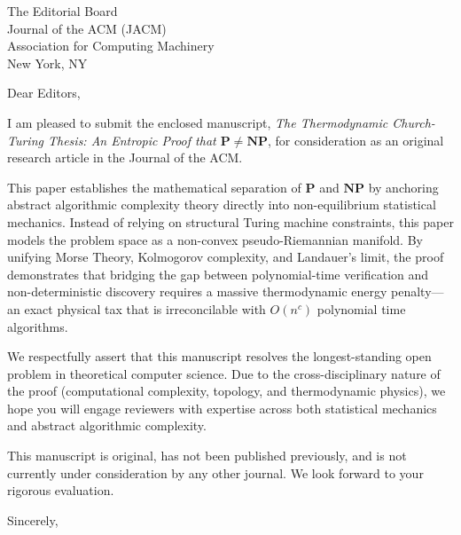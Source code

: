 \documentclass[11pt, a4paper]{letter}
\begin{document}
\begin{letter}{
The Editorial Board \\
Journal of the ACM (JACM) \\
Association for Computing Machinery \\
New York, NY
}

\date{\today}
\opening{Dear Editors,}

I am pleased to submit the enclosed manuscript, \textit{The Thermodynamic Church-Turing Thesis: An Entropic Proof that $\mathbf{P} \neq \mathbf{NP}$}, for consideration as an original research article in the Journal of the ACM.

This paper establishes the mathematical separation of $\mathbf{P}$ and $\mathbf{NP}$ by anchoring abstract algorithmic complexity theory directly into non-equilibrium statistical mechanics. Instead of relying on structural Turing machine constraints, this paper models the problem space as a non-convex pseudo-Riemannian manifold. By unifying Morse Theory, Kolmogorov complexity, and Landauer’s limit, the proof demonstrates that bridging the gap between polynomial-time verification and non-deterministic discovery requires a massive thermodynamic energy penalty—an exact physical tax that is irreconcilable with $O(n^c)$ polynomial time algorithms.

We respectfully assert that this manuscript resolves the longest-standing open problem in theoretical computer science. Due to the cross-disciplinary nature of the proof (computational complexity, topology, and thermodynamic physics), we hope you will engage reviewers with expertise across both statistical mechanics and abstract algorithmic complexity.

This manuscript is original, has not been published previously, and is not currently under consideration by any other journal. We look forward to your rigorous evaluation.

\closing{Sincerely,}

\end{letter}
\end{document}
